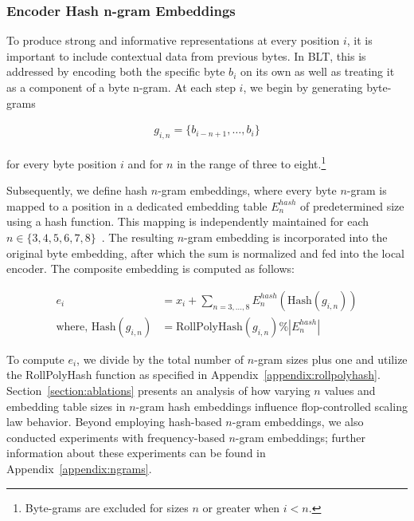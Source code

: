 \subsubsection{Encoder Hash n-gram Embeddings}
\label{sec:ngram-emb}
\label{sec:hash-emb}
To produce strong and informative representations at every position $i$, it is important to include contextual data from previous bytes. In {\textsc BLT}, this is addressed by encoding both the specific byte $b_i$ on its own as well as treating it as a component of a byte n-gram. At each step $i$, we begin by generating byte-grams

\begin{align}
    g_{i,n}=\{b_{i-n + 1},\ldots, b_i\}
\end{align}

for every byte position $i$ and for $n$ in the range of three to eight.\footnote{
Byte-grams are excluded for sizes $n$ or greater when $i < n$. }

Subsequently, we define hash $n$-gram embeddings, where every byte $n$-gram is mapped to a position in a dedicated embedding table $E_{n}^{hash}$ of predetermined size using a hash function. This mapping is independently maintained for each $n \in\{3,4,5,6,7,8\}$~\citep{bai2010learning}.  
The resulting $n$-gram embedding is incorporated into the original byte embedding, after which the sum is normalized and fed into the local encoder. The composite embedding is computed as follows:

\begin{align}
e_i &= x_i + \sum_{n = 3,...,8}E_{n}^{hash}(\text{Hash}(g_{i,n})) \\
\text{where, Hash}(g_{i,n}) &= \text{RollPolyHash}(g_{i,n}) \% |E_{n}^{hash}|
\end{align}

To compute $e_i$, we divide by the total number of $n$-gram sizes plus one and utilize the RollPolyHash function as specified in Appendix~\ref{appendix:rollpolyhash}. Section~\ref{section:ablations} presents an analysis of how varying $n$ values and embedding table sizes in $n$-gram hash embeddings influence flop-controlled scaling law behavior. Beyond employing hash-based $n$-gram embeddings, we also conducted experiments with frequency-based $n$-gram embeddings; further information about these experiments can be found in Appendix~\ref{appendix:ngrams}.

